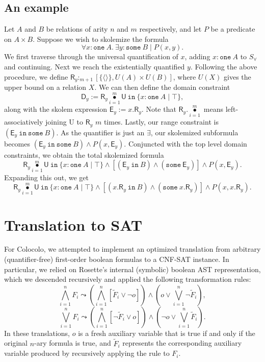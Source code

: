 \documentclass[10pt]{article}
\theoremstyle{definition}
\DeclareMathOperator{\bigdot}{\bullet}
\begin{document}
  \subsection{An example}
  Let $A$ and $B$ be relations of arity $n$ and $m$ respectively, and let $P$ be a predicate on $A\times B$. Suppose we wish to skolemize the formula
  \[\forall x : \texttt{one}\: A. \: \exists y : \texttt{some}\: B \mid P(x,y).\]
  We first traverse through the universal quantification of $x$, adding $x : \texttt{one}\: A$ to $S_\forall$ and continuing. Next we reach the existentially quantified $y$. Following the above procedure, we define $\textsf{R}_y :_{m + 1} [\{\langle \rangle\}, U(A)\times U(B)]$, where $U(X)$ gives the upper bound on a relation $X$. We can then define the domain constraint
  \[\textsf{D}_y := \textsf{R}_y \bigdot\limits_{i = 1}^m \textsf{U}~\texttt{in}~\{x : \texttt{one}\: A \mid \top\},\]
  along with the skolem expression $\textsf{E}_y := x.\textsf{R}_y$. Note that $\textsf{R}_y .\bigdot\limits_{i = 1}^m$ means left-associatively joining \textsf{U} to $\textsf{R}_y$ $m$ times. Lastly, our range constraint is $(\textsf{E}_y~\texttt{in}~\texttt{some}~B)$. As the quantifier is just an $\exists$, our skolemized subformula becomes $(\textsf{E}_y ~ \texttt{in}~\texttt{some}~B) \land P(x, \textsf{E}_y)$. Conjuncted with the top level domain constraints, we obtain the total skolemized formula
  \[\textsf{R}_y \bigdot\limits_{i = 1}^m \textsf{U}~\texttt{in}~\{x : \texttt{one}\: A \mid \top\} \land [(\textsf{E}_y ~ \texttt{in}~B) \land (\texttt{some} ~\textsf{E}_y)] \land P(x, \textsf{E}_y).\]
  Expanding this out, we get
  \[\textsf{R}_y \bigdot\limits_{i = 1}^m \textsf{U}~\texttt{in}~\{x : \texttt{one}\: A \mid \top\} \land [(x.\textsf{R}_y ~ \texttt{in}~B) \land (\texttt{some} ~x.\textsf{R}_y)] \land P(x, x.\textsf{R}_y).\]

  \section{Translation to SAT}
  For Colocolo, we attempted to implement an optimized translation from arbitrary (quantifier-free) first-order boolean formulas to a CNF-SAT instance. In particular, we relied on Rosette's internal (symbolic) boolean AST representation, which we descended recursively and applied the following transformation rules:
  \begin{equation}\label{transand}
    \bigwedge_{i=1}^n F_i \leadsto \left(\bigwedge_{i=1}^n [\tilde{F}_i \lor \neg o]\right) \land \left(o \lor \bigvee_{i=1}^n \neg\tilde{F}_i\right),
  \end{equation}
  \begin{equation}\label{transor}
    \bigvee_{i=1}^n F_i \leadsto \left(\bigwedge_{i=1}^n [\neg\tilde{F}_i \lor o]\right) \land \left(\neg o \lor \bigvee_{i=1}^n \tilde{F}_i\right).
  \end{equation}
  In these translations, $o$ is a fresh auxiliary variable that is true if and only if the original $n$-ary formula is true, and $\tilde{F}_i$ represents the corresponding auxiliary variable produced by recursively applying the rule to $F_i$. 
\end{document}
